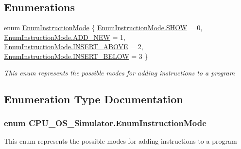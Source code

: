 \subsection*{Enumerations}
\begin{DoxyCompactItemize}
\item 
enum \hyperlink{namespace_c_p_u___o_s___simulator_adc17a5a5e004084f05dc8e4d3f70e31f}{Enum\+Instruction\+Mode} \{ \hyperlink{namespace_c_p_u___o_s___simulator_adc17a5a5e004084f05dc8e4d3f70e31fac34fbad9a5e2a1d0c8f7cf8d226808b9}{Enum\+Instruction\+Mode.\+S\+H\+O\+W} = 0, 
\hyperlink{namespace_c_p_u___o_s___simulator_adc17a5a5e004084f05dc8e4d3f70e31faee3564492739daa789b12c0b8a2e6a25}{Enum\+Instruction\+Mode.\+A\+D\+D\+\_\+\+N\+E\+W} = 1, 
\hyperlink{namespace_c_p_u___o_s___simulator_adc17a5a5e004084f05dc8e4d3f70e31fa956b44f941eb5917f3cfcf0ba56db19b}{Enum\+Instruction\+Mode.\+I\+N\+S\+E\+R\+T\+\_\+\+A\+B\+O\+V\+E} = 2, 
\hyperlink{namespace_c_p_u___o_s___simulator_adc17a5a5e004084f05dc8e4d3f70e31fa0310160f3dc4ecec481c20ca1cf88be3}{Enum\+Instruction\+Mode.\+I\+N\+S\+E\+R\+T\+\_\+\+B\+E\+L\+O\+W} = 3
 \}\begin{DoxyCompactList}\small\item\em This enum represents the possible modes for adding instructions to a program \end{DoxyCompactList}
\end{DoxyCompactItemize}


\subsection{Enumeration Type Documentation}
\hypertarget{namespace_c_p_u___o_s___simulator_adc17a5a5e004084f05dc8e4d3f70e31f}{}
\subsubsection[{Enum\+Instruction\+Mode}]{\setlength{\rightskip}{0pt plus 5cm}enum {\bf C\+P\+U\+\_\+\+O\+S\+\_\+\+Simulator.\+Enum\+Instruction\+Mode}\hspace{0.3cm}{\ttfamily [strong]}}\label{namespace_c_p_u___o_s___simulator_adc17a5a5e004084f05dc8e4d3f70e31f}


This enum represents the possible modes for adding instructions to a program 

